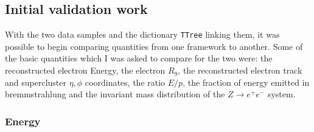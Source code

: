 \documentclass[10pt]{article}
\begin{document}
\subsection{Initial validation work}

With the two data samples and the dictionary \texttt{TTree} linking them, it was possible to begin comparing quantities from one framework to another. Some of the basic quantities which I was asked to compare for the two were: the reconstructed electron Energy, the electron $R_9$, the reconstructed electron track and supercluster $\eta,\phi$ coordinates, the ratio $E/p$, the fraction of energy emitted in bremmstrahlung and the invariant mass distribution of the $Z \rightarrow e^+ e^-$ system.

\subsubsection{Energy}
\end{document}
